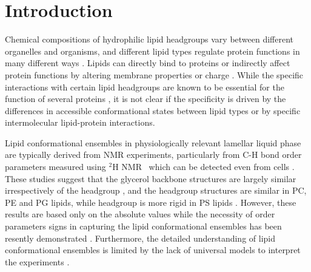 \documentclass[aps,prl,superscriptaddress,twocolumn]{revtex4}
\begin{document}
\section{Introduction}

Chemical compositions of hydrophilic lipid headgroups vary between different
organelles and organisms, and different lipid types
regulate protein functions in many different ways \cite{lee03,vanmeer08}.
Lipids can directly bind to proteins or indirectly affect protein
functions by altering membrane properties or charge \cite{lee03,lemmon08}.
While the specific interactions with certain lipid headgroups
are known to be essential for the function of several proteins \cite{lee11,lemmon08},
it is not clear if the specificity is driven by the differences in accessible
conformational states between lipid types or
by specific intermolecular lipid-protein interactions.

Lipid conformational ensembles in physiologically relevant lamellar liquid phase
are typically derived from NMR experiments, particularly from 
C-H bond order parameters measured using $^2$H NMR~\cite{seelig77c,davis83,Semchyschyn04}
which can be detected even from cells \cite{gally81,scherer87,seelig90}.
These studies suggest that the glycerol backbone structures are largely similar irrespectively of the headgroup \cite{gally81}, 
and the headgroup structures are similar in PC, PE and PG lipids, while headgroup is more rigid in PS lipids \cite{wohlgemuth80,buldt81}. 
However, these results are based only on the absolute values while 
the necessity of order parameters signs in capturing the lipid conformational ensembles has been resently demonstrated \cite{botan15,ollila16,ferreira16}.
Furthermore, the detailed understanding of lipid conformational ensembles
is limited by the lack of universal models to interpret the experiments \cite{pezeshkian18,akutsu20}.
\end{document}
